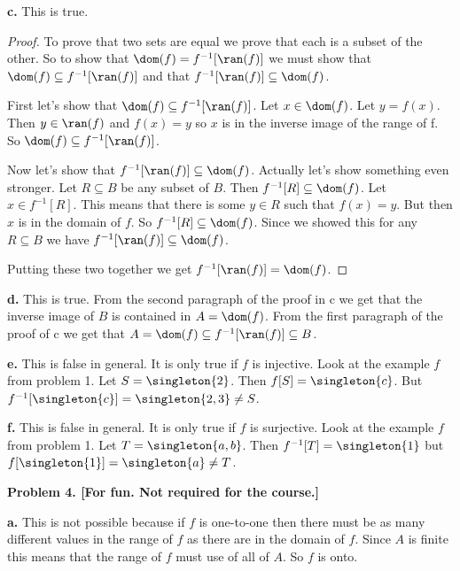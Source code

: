 \documentclass[oneside,12pt]{amsart}
\begin{document}
\textbf{c.} This is true.
\begin{proof}
To prove that two sets are equal we prove that each is a subset of the other.
So to show that $\dom(f) = f^{-1}[\ran(f)]$ we must show that
$\dom(f)\subseteq f^{-1}[\ran(f)]$ and that $f^{-1}[\ran(f)] \subseteq \dom(f)$.

First let's show that $\dom(f)\subseteq f^{-1}[\ran(f)]$. Let $x\in\dom(f)$.
Let $y=f(x)$. Then $y\in\ran(f)$ and $f(x) = y$ so $x$ is in the inverse image
of the range of f. So $\dom(f)\subseteq f^{-1}[\ran(f)]$.

Now let's show that $f^{-1}[\ran(f)] \subseteq \dom(f)$. Actually let's show
something even stronger. Let $R\subseteq B$ be any subset of $B$. Then
$f^{-1}[R] \subseteq \dom(f)$. Let $x\in f^{-1}[R]$.
This means that there is some $y\in R$ such that $f(x) = y$. But then
$x$ is in the domain of $f$. So $f^{-1}[R] \subseteq \dom(f)$. Since we showed
this for any $R\subseteq B$ we have $f^{-1}[\ran(f)] \subseteq \dom(f)$.

Putting these two together we get $f^{-1}[\ran(f)] = \dom(f)$.
\end{proof}

\textbf{d.} This is true. From the second paragraph of the proof in c we
get that the inverse image of $B$ is contained in $A = \dom(f)$. From the
first paragraph of the proof of c we get that
$A = \dom(f)\subseteq f^{-1}[\ran(f)] \subseteq B$.

\textbf{e.} This is false in general. It is only true if $f$ is injective.
Look at the example $f$ from problem 1. Let $S = \singleton{2}$. Then
$f[S] = \singleton{c}$. But $f^{-1}[\singleton{c}] = \singleton{2,3} \not= S$.


\textbf{f.} This is false in general. It is only true if $f$ is surjective.
Look at the example $f$ from problem 1. Let $T=\singleton{a,b}$. Then
$f^{-1}[T] = \singleton{1}$ but $f[\singleton{1}] = \singleton{a} \not= T$.

\medskip

\textbf{Problem 4. [For fun. Not required for the course.]}

\textbf{a.} This is not possible because if $f$ is one-to-one then there must
be as many different values in the range of $f$ as there are in the domain
of $f$. Since $A$ is finite this means that the range of $f$ must use of all
of $A$. So $f$ is onto.
\end{document}
